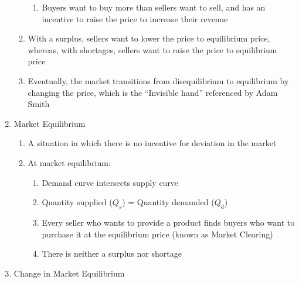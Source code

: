 \documentclass[12pt]{article}
\begin{document}
\begin{enumerate}
\begin{enumerate}
            \begin{enumerate}

              \item Buyers want to buy more than sellers want to sell, and has an incentive to raise the price to increase their revenue

            \end{enumerate}

          \item With a surplus, sellers want to lower the price to equilibrium price, whereas, with shortages, sellers want to raise the price to equilibrium price

          \item Eventually, the market transitions from disequilibrium to equilibrium by changing the price, which is the “Invisible hand” referenced by Adam Smith

        \end{enumerate}
        
      \item Market Equilibrium

        \begin{enumerate}

          \item A situation in which there is no incentive for deviation in the market

          \item At market equilibrium:

            \begin{enumerate}

              \item Demand curve intersects supply curve

              \item Quantity supplied ($Q_s$) = Quantity demanded ($Q_d$)

              \item Every seller who wants to provide a product finds buyers who want to purchase it at the equilibrium price (known as Market Clearing)

              \item There is neither a surplus nor shortage

            \end{enumerate}

        \end{enumerate}
    
      \item Change in Market Equilibrium


\end{enumerate}
\end{document}

